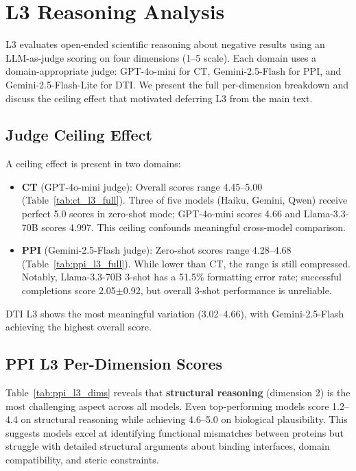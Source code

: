 \section{L3 Reasoning Analysis}
\label{app:l3_analysis}

L3 evaluates open-ended scientific reasoning about negative results using an LLM-as-judge scoring on four dimensions (1--5 scale). Each domain uses a domain-appropriate judge: GPT-4o-mini for CT, Gemini-2.5-Flash for PPI, and Gemini-2.5-Flash-Lite for DTI. We present the full per-dimension breakdown and discuss the ceiling effect that motivated deferring L3 from the main text.

\subsection{Judge Ceiling Effect}

A ceiling effect is present in two domains:
\begin{itemize}[nosep,leftmargin=*]
    \item \textbf{CT} (GPT-4o-mini judge): Overall scores range 4.45--5.00 (Table~\ref{tab:ct_l3_full}). Three of five models (Haiku, Gemini, Qwen) receive perfect 5.0 scores in zero-shot mode; GPT-4o-mini scores 4.66 and Llama-3.3-70B scores 4.997. This ceiling confounds meaningful cross-model comparison.
    \item \textbf{PPI} (Gemini-2.5-Flash judge): Zero-shot scores range 4.28--4.68 (Table~\ref{tab:ppi_l3_full}). While lower than CT, the range is still compressed. Notably, Llama-3.3-70B 3-shot has a 51.5\% formatting error rate; successful completions score 2.05$\pm$0.92, but overall 3-shot performance is unreliable.
\end{itemize}

DTI L3 shows the most meaningful variation (3.02--4.66), with Gemini-2.5-Flash achieving the highest overall score.

\subsection{PPI L3 Per-Dimension Scores}

Table~\ref{tab:ppi_l3_dims} reveals that \textbf{structural reasoning} (dimension 2) is the most challenging aspect across all models. Even top-performing models score 1.2--4.4 on structural reasoning while achieving 4.6--5.0 on biological plausibility. This suggests models excel at identifying functional mismatches between proteins but struggle with detailed structural arguments about binding interfaces, domain compatibility, and steric constraints.

